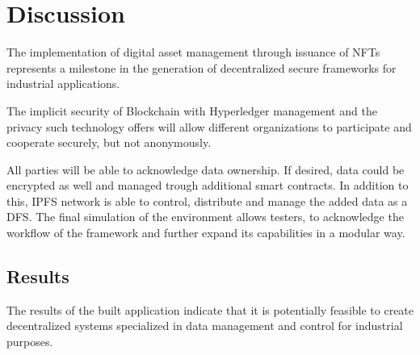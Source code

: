 
\chapter{Discussion}
\label{ch:discussion}
The implementation of digital asset management through issuance of \ac{NFT}s represents a milestone in the generation of decentralized secure frameworks for industrial applications.

The implicit security of Blockchain with Hyperledger management and the privacy such technology offers will allow different organizations to participate and cooperate securely, but not anonymously. 

All parties will be able to acknowledge data ownership. If desired, data could be encrypted as well and managed trough additional smart contracts. In addition to this, \ac{IPFS} network is able to control, distribute and manage the added data as a \ac{DFS}. The final simulation of the environment allows testers, to acknowledge the workflow of the framework and further expand its capabilities in a modular way.

\section{Results}
The results of the built application indicate that it is potentially feasible to create decentralized systems specialized in data management and control for industrial purposes.